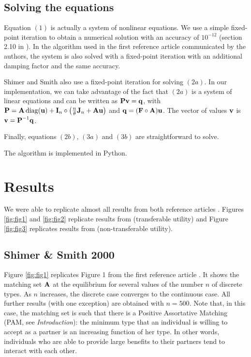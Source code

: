 \subsection*{Solving the equations}

Equation $(1)$ is actually a system of nonlinear equations. We use a simple fixed-point iteration to obtain a numerical solution with an accuracy of $10^{-12}$ (section 2.10 in \citep{atkinson_introduction_1989}). In the algorithm used in the first reference article \citep{shimer_assortative_2000} communicated by the authors, the system is also solved with a fixed-point iteration with an additional damping factor and the same accuracy.

Shimer and Smith \citep{shimer_assortative_2000} also use a fixed-point iteration for solving $(2a)$. In our implementation, we can take advantage of the fact that $(2a)$ is a system of linear equations and can be written as $\boldsymbol{\mathbf{P}} \boldsymbol{\mathbf{v}} = \boldsymbol{\mathbf{q}}$, with $\boldsymbol{\mathbf{P}} = \boldsymbol{\mathbf{A}} \operatorname{diag}(\boldsymbol{\mathbf{u}}) + \boldsymbol{\mathbf{I}}_n \circ \left(\frac{n}{\theta} \boldsymbol{\mathbf{J}}_n + \boldsymbol{\mathbf{A}} \boldsymbol{\mathbf{u}}\right)$ and $\boldsymbol{\mathbf{q}} = (\boldsymbol{\mathbf{F}} \circ \boldsymbol{\mathbf{A}}) \boldsymbol{\mathbf{u}}$. The vector of values $\boldsymbol{\mathbf{v}}$ is $ \boldsymbol{\mathbf{v}} = \boldsymbol{\mathbf{P}}^{-1} \boldsymbol{\mathbf{q}} $.

Finally, equations $(2b)$, $(3a)$ and $(3b)$ are straightforward to solve.

The algorithm is implemented in Python.





\section*{Results}

We were able to replicate almost all results from both reference articles \citep{shimer_assortative_2000,smith_marriage_2006}. Figures \ref{fig:fig1} and \ref{fig:fig2} replicate results from \citep{shimer_assortative_2000} (transferable utility) and Figure \ref{fig:fig3} replicates results from \citep{smith_marriage_2006} (non-transferable utility).

\subsection*{Shimer \& Smith 2000}

Figure \ref{fig:fig1} replicates Figure 1 from the first reference article \citep{shimer_assortative_2000}. It shows the matching set $\boldsymbol{\mathbf{A}}$ at the equilibrium for several values of the number $n$ of discrete types. As $n$ increases, the discrete case converges to the continuous case. All further results (with one exception) are obtained with $n=500$. Note that, in this case, the matching set is such that there is a Positive Assortative Matching (PAM, see \textit{Introduction}): the minimum type that an individual is willing to accept as a partner is an increasing function of her type. In other words, individuals who are able to provide large benefits to their partners tend to interact with each other.

